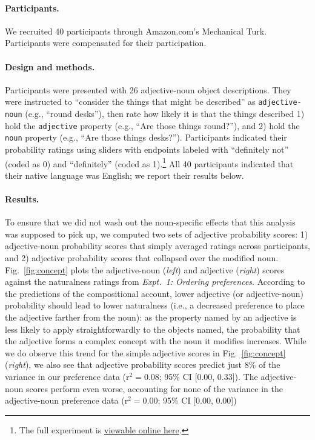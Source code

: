 \documentclass[12pt]{article}
\newcommand{\jd}[1]{\textcolor{red}{[jd: #1]}}
\begin{document}
\paragraph{Participants.} We recruited 40 participants through Amazon.com's Mechanical Turk.  Participants were compensated for their participation.

\paragraph{Design and methods.} Participants were presented with 26 adjective-noun object descriptions. They were instructed to ``consider the things that might be described'' as \texttt{adjective-noun} (e.g., ``round desks''), then rate how likely it is that the things described 1) hold the \texttt{adjective} property (e.g., ``Are those things round?''), and 2) hold the \texttt{noun} property (e.g., ``Are those things desks?''). %
 Participants indicated their probability ratings using sliders with endpoints labeled with ``definitely not'' (coded as 0) and ``definitely'' (coded as 1).\footnote{The full experiment is \href{http://web.stanford.edu/~scontras/adjective_ordering/experiments/9-concept-formability/concept-formability.html}{viewable online here}.} All 40 participants indicated that their native language was English; we report their results below.

\paragraph{Results.} %
To ensure that we did not wash out the noun-specific effects that this analysis was supposed to pick up, we computed two sets of adjective probability scores: 1) adjective-noun probability scores that simply averaged ratings across participants, and 2) adjective probability scores that collapsed over the modified noun. 
Fig.~\ref{fig:concept} plots the adjective-noun (\emph{left}) and adjective (\emph{right}) scores against the naturalness ratings from \emph{Expt.~1: Ordering preferences}. According to the predictions of the compositional account, lower adjective (or adjective-noun) probability should lead to lower naturalness (i.e., a decreased preference to place the adjective farther from the noun): 
as the property named by an adjective is less likely to apply straightforwardly to the objects named, the probability that the adjective forms a complex concept with the noun it modifies increases. %
While we do observe this trend for the simple adjective scores in Fig.~\ref{fig:concept} (\emph{right}), we also see that adjective probability scores predict just 8\% of the variance in our preference data (r$^{2}=0.08$; 95\% CI [0.00,  0.33]). The adjective-noun scores perform even worse, accounting for none of the variance in the adjective-noun preference data (r$^{2}=0.00$; 95\% CI [0.00,  0.00])
\end{document}
